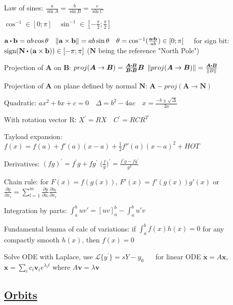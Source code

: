 \documentclass[11pt,landscape]{article}
\begin{document}
Law of sines:
$
\frac{a}{\sin{A}} =
\frac{b}{\sin{B}} =
\frac{c}{\sin{C}}
$

$
\cos^{-1} \in [0; \pi]
\quad
\sin^{-1} \in [-\frac{\pi}{2}; \frac{\pi}{2}]
$

$
\mathbf{a} \dotp \mathbf{b} = a b \cos{\theta}
\quad
\lVert \mathbf{a} \times \mathbf{b} \rVert = a b \sin{\theta}
\quad
\theta = \cos^{-1}({\frac{\mathbf{a} \dotp \mathbf{b}}{ab}}) \in [0; \pi]
\quad
$
for sign bit:
$
\text{sign}( \mathbf{N} \dotp (\mathbf{a} \times \mathbf{b})) \in [-\pi; \pi]
$
($\mathbf{N}$ being the reference "North Pole")

Projection of $\bm A$ on $\bm B$:
$proj(\bm A \rightarrow \bm B) = \frac{\bm A \dotp \bm B}{\bm B \dotp \bm B} \bm B$
\quad
$\norm{proj(\bm A \rightarrow \bm B)} = \frac{\bm A \dotp \bm B}{\norm{B}}$

Projection of $\bm A$ on plane defined by normal $\bm N$:
$\bm A - proj(\bm A \rightarrow \bm N)$

Quadratic:
$
ax^2 + bx + c = 0
\quad
\Delta = b^2 - 4ac
\quad
x = \frac{-b \pm \sqrt{\Delta}}{2a}
$

With rotation vector R:
$X^\prime = RX \quad C^\prime = RCR^T$

Tayload expansion:
$
f(x) = f(a) + f'(a)(x-a) + \frac{1}{2}f''(a)(x-a)^2 + HOT
$

Derivatives:
$(fg)^\prime = f^\prime g + fg^\prime$
\quad
$\big( \frac{f}{g} \big)^\prime = \frac{f^\prime g - fg^\prime}{g^2}$

Chain rule: for $F(x)=f(g(x))$, $F'(x)=f'(g(x))g'(x)$
or $\frac{\partial y}{\partial x_i} = 
\sum_{l=1}^{m} \frac{\partial y}{\partial u_l}\frac{\partial u_l}{\partial x_i}$

Integration by parts: $\int_{a}^{b} u v' = [uv]_{a}^{b} - \int_{a}^{b} u'v$

Fundamental lemma of calc of variations:
if $\int_{a}^{b}f(x)h(x) = 0$ for any compactly smooth $h(x)$, then $f(x)=0$

Solve ODE with Laplace, use 
$\mathcal{L}\{y^\prime\} = sY-y_0$
$\quad$
for linear ODE $\dot{\bm x}=A \bm x$, $\bm x=\sum_i c_i \bm v_i e^{\lambda_i t}$
where $A \bm v = \lambda \bm v$


\newpage
\subsection{\underline{Orbits}}

\begin{wrapfigure}{r}{0.25\textwidth}
\end{wrapfigure}
\end{document}
